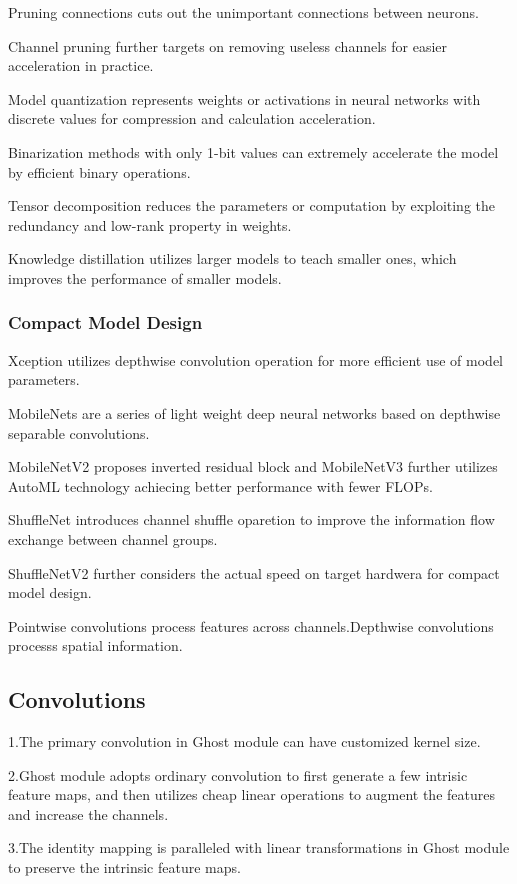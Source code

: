 \documentclass[11pt]{article}
\begin{document}
Pruning connections cuts out the unimportant connections between neurons.

Channel pruning further targets on removing useless channels for easier acceleration in practice.

Model quantization represents weights or activations in neural networks with discrete values for compression and calculation acceleration.

Binarization methods with only 1-bit values can extremely accelerate the model by efficient binary operations.

Tensor decomposition reduces the parameters or computation by exploiting the redundancy and low-rank property in weights.

Knowledge distillation utilizes larger models to teach smaller ones, which improves the performance of smaller models.
\subsubsection{Compact Model Design}
Xception utilizes depthwise convolution operation for more efficient use of model parameters.

MobileNets are a series of light weight deep neural networks based on depthwise separable convolutions.

MobileNetV2 proposes inverted residual block and MobileNetV3 further utilizes AutoML technology achiecing better performance with fewer FLOPs.

ShuffleNet introduces channel shuffle oparetion to improve the information flow exchange between channel groups.

ShuffleNetV2 further considers the actual speed on target hardwera for compact model design.

Pointwise convolutions process features across channels.Depthwise convolutions processs spatial information.
\subsection{Convolutions}
\noindent1.The primary convolution in Ghost module can have customized kernel size.

\noindent2.Ghost module adopts ordinary convolution to first generate a few intrisic feature maps, and then utilizes cheap linear operations to augment the features and increase the channels.

\noindent3.The identity mapping is paralleled with linear transformations in Ghost module to preserve the intrinsic feature maps.
\end{document}
